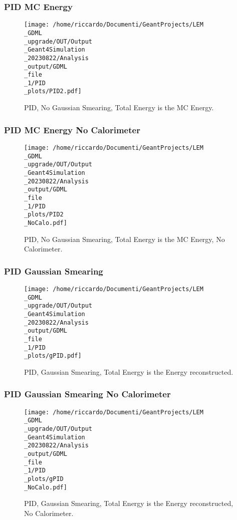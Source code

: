 \documentclass[8pt]{beamer}
\begin{document}
            \begin{frame}
                \frametitle{PID MC Energy}
            
        \begin{figure}[h]
            \centering
            \texttt{[image: /home/riccardo/Documenti/GeantProjects/LEM\\\_GDML\\\_upgrade/OUT/Output\\\_Geant4Simulation\\\_20230822/Analysis\\\_output/GDML\\\_file\\\_1/PID\\\_plots/PID2.pdf]}
            \caption{PID, No Gaussian Smearing, Total Energy is the MC Energy.}
        \end{figure}
        
            \end{frame}
            
            \begin{frame}
                \frametitle{PID MC Energy No Calorimeter}
            
        \begin{figure}[h]
            \centering
            \texttt{[image: /home/riccardo/Documenti/GeantProjects/LEM\\\_GDML\\\_upgrade/OUT/Output\\\_Geant4Simulation\\\_20230822/Analysis\\\_output/GDML\\\_file\\\_1/PID\\\_plots/PID2\\\_NoCalo.pdf]}
            \caption{PID, No Gaussian Smearing, Total Energy is the MC Energy, No Calorimeter.}
        \end{figure}
        
            \end{frame}
            
            \begin{frame}
                \frametitle{PID Gaussian Smearing}
            
        \begin{figure}[h]
            \centering
            \texttt{[image: /home/riccardo/Documenti/GeantProjects/LEM\\\_GDML\\\_upgrade/OUT/Output\\\_Geant4Simulation\\\_20230822/Analysis\\\_output/GDML\\\_file\\\_1/PID\\\_plots/gPID.pdf]}
            \caption{PID, Gaussian Smearing, Total Energy is the Energy reconstructed.}
        \end{figure}
        
            \end{frame}
            
            \begin{frame}
                \frametitle{PID Gaussian Smearing No Calorimeter}
            
        \begin{figure}[h]
            \centering
            \texttt{[image: /home/riccardo/Documenti/GeantProjects/LEM\\\_GDML\\\_upgrade/OUT/Output\\\_Geant4Simulation\\\_20230822/Analysis\\\_output/GDML\\\_file\\\_1/PID\\\_plots/gPID\\\_NoCalo.pdf]}
            \caption{PID, Gaussian Smearing, Total Energy is the Energy reconstructed, No Calorimeter.}
        \end{figure}
        
            \end{frame}
            
\end{document}

